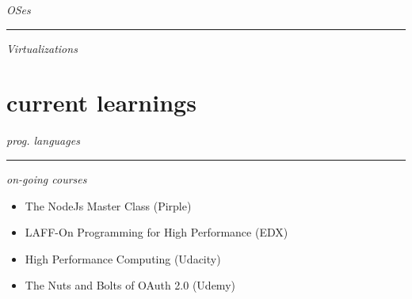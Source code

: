 \documentclass[12pt]{res}
\begin{document}
\begin{resume}
\begin{minipage}[t]{0.2\linewidth}
{		\begin{minipage}[t]{1.0\linewidth}
			\vspace{5pt}
			\raggedright{\emph{OSes}}
		\end{minipage}
		\begin{minipage}[t]{1.0\linewidth}
			\vspace{5pt}
			\vspace{5pt}
		\end{minipage}
		\rule{1.0\textwidth}{0.1pt}
		
		\begin{minipage}[t]{1.0\linewidth}
			\vspace{5pt}
			\raggedright{\emph{Virtualizations}}
		\end{minipage}
		\begin{minipage}[t]{1.0\linewidth}
			\vspace{5pt}
		\end{minipage}
	}
\end{minipage}
\hfill
\begin{minipage}[t]{0.35\linewidth}
	\section{current learnings}
	\footnotesize{		
		\begin{minipage}[t]{1.0\linewidth}
			\raggedright{\emph{prog. languages}}
		\end{minipage}
		\begin{minipage}[t]{1.0\linewidth}
			\vspace{5pt}
			\vspace{5pt}
		\end{minipage}
		\rule{1.0\textwidth}{0.1pt}

		\begin{minipage}[t]{0.5\linewidth}
			\vspace{5pt}
			\raggedright{\emph{on-going courses}}
		\end{minipage}
		\begin{minipage}[t]{1.0\linewidth}
			\vspace{5pt}
			\begin{flushleft}
				\begin{itemize}
					\item The NodeJs Master Class (Pirple)
					\item LAFF-On Programming for High Performance (EDX)
					\item High Performance Computing (Udacity)
					\item The Nuts and Bolts of OAuth 2.0 (Udemy)
				\end{itemize}
			\end{flushleft}
			\vspace{5pt}
		\end{minipage}
	}
\end{minipage}
\hfill
\begin{minipage}[t]{0.4\linewidth}

\end{minipage}
\end{resume}
\end{document}
